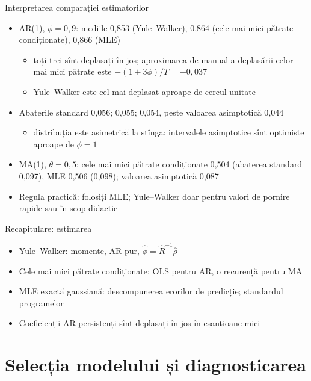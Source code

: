 \begin{frame}{Interpretarea comparației estimatorilor}
\itemsize{\small}
\begin{itemize}
    \item AR(1), $\phi = 0{,}9$: mediile 0{,}853 (Yule--Walker), 0{,}864 (cele mai mici pătrate condiționate), 0{,}866 (MLE)
    \begin{itemize}
        \item toți trei sînt deplasați în jos; aproximarea de manual a deplasării celor mai mici pătrate este $-(1 + 3\phi)/T = \ensuremath{-}0{,}037$
        \item Yule--Walker este cel mai deplasat aproape de cercul unitate
    \end{itemize}
    \item Abaterile standard 0{,}056; 0{,}055; 0{,}054, peste valoarea asimptotică 0{,}044
    \begin{itemize}
        \item distribuția este asimetrică la stînga: intervalele asimptotice sînt optimiste aproape de $\phi = 1$
    \end{itemize}
    \item MA(1), $\theta = 0{,}5$: cele mai mici pătrate condiționate 0{,}504 (abaterea standard 0{,}097), MLE 0{,}506 (0{,}098); valoarea asimptotică 0{,}087
    \item Regula practică: folosiți MLE; Yule--Walker doar pentru valori de pornire rapide sau în scop didactic
\end{itemize}
\end{frame}

\begin{frame}{Recapitulare: estimarea}
\itemsize{\small}
\begin{itemize}
    \item Yule--Walker: momente, AR pur, $\hat\phi = \hat R^{-1}\hat\rho$
    \item Cele mai mici pătrate condiționate: OLS pentru AR, o recurență pentru MA
    \item MLE exactă gaussiană: descompunerea erorilor de predicție; standardul programelor
    \item Coeficienții AR persistenți sînt deplasați în jos în eșantioane mici
\end{itemize}
\end{frame}


\section{Selecția modelului și diagnosticarea}

